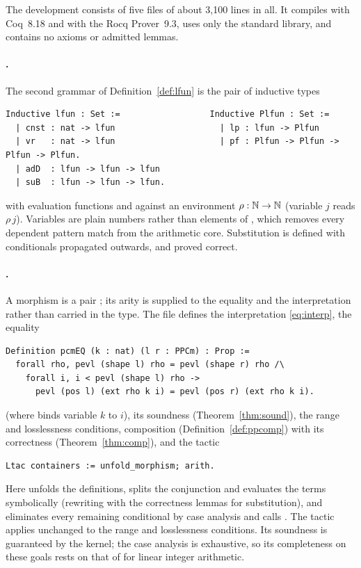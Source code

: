 \documentclass{fundam}
\begin{document}
The development consists of five files of about 3,100 lines in all.  It compiles with
Coq~8.18 and with the Rocq Prover~9.3, uses only the standard library, and contains no
axioms or admitted lemmas.

\paragraph{.}  The second grammar of Definition~\ref{def:lfun} is the pair
of inductive types
\begin{lstlisting}
Inductive lfun : Set :=                  Inductive Plfun : Set :=
  | cnst : nat -> lfun                     | lp : lfun -> Plfun
  | vr   : nat -> lfun                     | pf : Plfun -> Plfun -> Plfun -> Plfun.
  | adD  : lfun -> lfun -> lfun
  | suB  : lfun -> lfun -> lfun.
\end{lstlisting}
with evaluation functions  and  against an environment
$\rho : \mathbb{N} \to \mathbb{N}$ (variable $j$ reads $\rho\,j$).  Variables are plain numbers rather
than elements of , which removes every dependent pattern match from the
arithmetic core.  Substitution  is defined with conditionals propagated
outwards, and proved correct.

\paragraph{.}  A morphism is a pair ;
its arity is supplied to the equality and the interpretation rather than carried in the
type.  The file defines the interpretation \eqref{eq:interp}, the equality
\begin{lstlisting}
Definition pcmEQ (k : nat) (l r : PPCm) : Prop :=
  forall rho, pevl (shape l) rho = pevl (shape r) rho /\
    forall i, i < pevl (shape l) rho ->
      pevl (pos l) (ext rho k i) = pevl (pos r) (ext rho k i).
\end{lstlisting}
(where  binds variable $k$ to $i$), its soundness
(Theorem~\ref{thm:sound}), the range and losslessness conditions, composition
(Definition~\ref{def:ppcomp}) with its correctness (Theorem~\ref{thm:comp}), and the tactic
\begin{lstlisting}
Ltac containers := unfold_morphism; arith.
\end{lstlisting}
Here  unfolds the definitions, splits the conjunction and evaluates
the terms symbolically (rewriting with the correctness lemmas for substitution), and
\coq{arith} eliminates every remaining conditional by case analysis and calls .
The tactic applies unchanged to the range and losslessness conditions.  Its soundness is
guaranteed by the kernel; the case analysis is exhaustive, so its completeness on these
goals rests on that of \coq{lia} for linear integer arithmetic.
\end{document}
